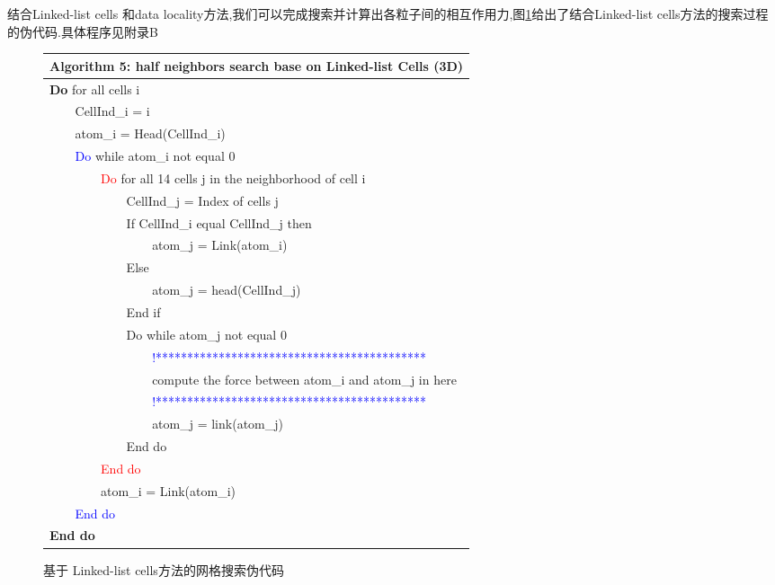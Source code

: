 \documentclass[a4paper]{article}
\begin{document}
结合Linked-list cells 和data locality方法,我们可以完成搜索并计算出各粒子间的相互作用力,图\ref{Alg5}给出了结合Linked-list cells方法的搜索过程的伪代码.具体程序见附录B


\begin{figure}[!htb]
\centering
\begin{tabular}{|l|ll|ll|lllll}
\hline
\multicolumn{10}{|l|}{Algorithm 5: half neighbors search base on Linked-list Cells (3D)} \\
\hline
\multicolumn{10}{|l|}{\textbf{Do} for all cells i} \\
 &  & \multicolumn{8}{l|}{CellInd\_i = i} \\
 &  & \multicolumn{8}{l|}{atom\_i = Head(CellInd\_i)} \\
 &  & \multicolumn{8}{l|}{\textcolor{blue}{Do} while atom\_i not equal 0} \\
 &  &  &  & \multicolumn{6}{l|}{\textcolor{red}{Do} for all 14 cells j in the neighborhood of cell i} \\
 &  &  &  &  &  & \multicolumn{4}{l|}{ CellInd\_j = Index of cells j} \\
 &  &  &  &  &  & \multicolumn{4}{l|}{If  CellInd\_i equal CellInd\_j  then} \\
 &  &  &  &  &  &  &  & \multicolumn{2}{l|}{atom\_j = Link(atom\_i)} \\
 &  &  &  &  &  & \multicolumn{4}{l|}{Else} \\
 &  &  &  &  &  &  &  & \multicolumn{2}{l|}{atom\_j = head(CellInd\_j)} \\
 &  &  &  &  &  & \multicolumn{4}{l|}{End if} \\
 &  &  &  &  &  & \multicolumn{4}{l|}{Do while atom\_j not equal 0} \\
 &  &  &  &  &  &  &  & \multicolumn{2}{l|}{\textcolor{blue}{!*******************************************}} \\
 &  &  &  &  &  &  &  & \multicolumn{2}{l|}{compute the force between atom\_i and atom\_j in here} \\
 &  &  &  &  &  &  &  & \multicolumn{2}{l|}{\textcolor{blue}{!*******************************************}} \\
 &  &  &  &  &  &  &  & \multicolumn{2}{l|}{ atom\_j = link(atom\_j)} \\
 &  &  &  &  &  & \multicolumn{4}{l|}{End do} \\
 &  &  &  & \multicolumn{6}{l|}{\textcolor{red}{End do}} \\
 &  &  &  & \multicolumn{6}{l|}{atom\_i = Link(atom\_i)} \\
 &  & \multicolumn{8}{l|}{\textcolor{blue}{End do }} \\
\multicolumn{10}{|l|}{\textbf{End do}} \\
\hline
\end{tabular}
\caption{\label{Alg5}基于 Linked-list cells方法的网格搜索伪代码}
\end{figure}
\end{document}
